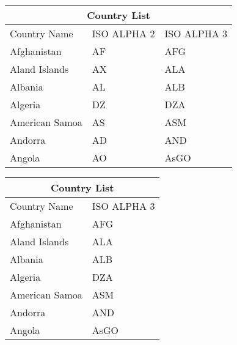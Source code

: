 \documentclass{article}
\begin{document}
\begin{tabular}{ |p{3cm}|p{3cm}|p{3cm}|  }
  \hline  
  \multicolumn{3}{|c|}{Country List} \\
  \hline
  Country Name & ISO ALPHA 2 & ISO ALPHA 3 \\
  \hline
    Afghanistan & AF & AFG \\
    Aland Islands &  AX   & ALA \\
    Albania & AL & ALB \\
    Algeria & DZ & DZA \\
    American Samoa & AS & ASM \\
    Andorra & AD & AND   \\
    Angola & AO & AsGO \\
  \hline
\end{tabular}

\begin{tabular}{ |p{3cm}|p{3cm}|  }
  \hline  
  \multicolumn{2}{|c|}{Country List} \\
  \hline
  Country Name & ISO ALPHA 3 \\
  \hline
    Afghanistan & AFG \\
    Aland Islands & ALA \\
    Albania & ALB \\
    Algeria & DZA \\
    American Samoa & ASM \\
    Andorra &  AND   \\
    Angola &  AsGO \\
  \hline
\end{tabular}


\end{document}
